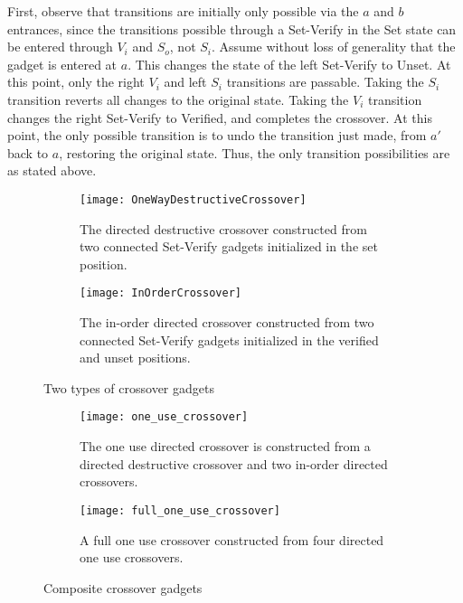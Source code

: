 First, observe that transitions are initially only possible via the $a$ and $b$ entrances, since the transitions possible through a Set-Verify in the Set state can be entered through $V_i$ and $S_o$, not $S_i$. Assume without loss of generality that the gadget is entered at $a$. This changes the state of the left Set-Verify to Unset. At this point, only the right $V_i$ and left $S_i$ transitions are passable. Taking the $S_i$ transition reverts all changes to the original state. Taking the $V_i$ transition changes the right Set-Verify to Verified, and completes the crossover. At this point, the only possible transition is to undo the transition just made, from $a'$ back to $a$, restoring the original state. Thus, the only transition possibilities are as stated above.

\begin{figure}[!ht]
  \centering
  \begin{subfigure}[b]{0.47\textwidth}
    \texttt{[image: OneWayDestructiveCrossover]}
    \caption{The directed destructive crossover constructed from two connected Set-Verify gadgets initialized in the set position.}
    \label{DestructiveCrossover}
  \end{subfigure}
  \hfill
  \begin{subfigure}[b]{0.47\textwidth}
    \texttt{[image: InOrderCrossover]}
    \caption{The in-order directed crossover constructed from two connected Set-Verify gadgets initialized in the verified and unset positions.}
    \label{InOrderCrossover}
  \end{subfigure}
  \caption{Two types of crossover gadgets}
\end{figure}

\begin{figure}[!ht]
  \centering
  \begin{subfigure}[b]{0.48\textwidth}
    \texttt{[image: one\_use\_crossover]}
    \caption{The one use directed crossover is constructed from a directed destructive crossover and two in-order directed crossovers.}
    \label{OneUseCrossover}
  \end{subfigure}
  \hfill
  \begin{subfigure}[b]{0.43\textwidth}
    \texttt{[image: full\_one\_use\_crossover]}
    \caption{A full one use crossover constructed from four directed one use crossovers.}
    \label{full_one_use_crossover}
  \end{subfigure}
  \caption{Composite crossover gadgets}
\end{figure}

